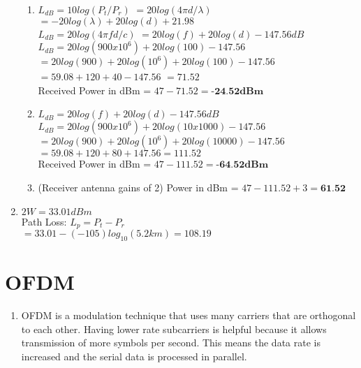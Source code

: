 \documentclass[11pt]{article}
\begin{document}
\begin{enumerate}[label=(\alph*)]
{\begin{enumerate}[label=(\roman*)]
{		$P_{dbM} = 10log(P_{mW}/1mW)$
		$= 10log(50000) \approx 47dBm$
	}
	
	\item{
		$L_{dB} = 10log(P_t/P_r)$
		$= 20log(4\pi d/ \lambda)$
		$= -20log(\lambda) + 20log(d) + 21.98$ \\
		
		$L_{dB} = 20log(4\pi f d/c)$
		$ = 20log(f) + 20log(d) - 147.56dB$ \\
		
		$L_{dB} = 20log(900x10^6) + 20log(100) - 147.56$
		$= 20log(900) + 20log(10^6) + 20log(100) - 147.56$
		$= 59.08 + 120 + 40 - 147.56$
		$= 71.52$ \\
		
		Received Power in dBm = $47-71.52 = \textbf{-24.52dBm}$
	}
	
	\item {
		$L_{dB} = 20log(f) + 20log(d) - 147.56dB$ \\
	
		$L_{dB} = 20log(900x10^6) + 20log(10x1000) - 147.56$ \\
		$= 20log(900) + 20log(10^6) + 20log(10000) - 147.56$ \\ 
		$= 59.08 + 120 + 80 + 147.56 = 111.52$ \\
	
		Received Power in dBm = $47 - 111.52 = \textbf{-64.52dBm}$
	}
	
	\item { 
		(Receiver antenna gains of 2) Power in dBm = $47 - 111.52 + 3 = \textbf{61.52}$
	}
	\end{enumerate}
}
\item {
	$2W = 33.01 dBm$ \\
	Path Loss: $L_p = P_t - P_r$ \\
	$= 33.01 - (-105)log_{10}(5.2km) = 108.19$ \\ 
}
\end{enumerate}
 
 
\section{OFDM}
\begin{enumerate}[label=(\alph*)]
\item {
	OFDM is a modulation technique that uses many carriers that are orthogonal to each other.
	Having lower rate subcarriers is helpful because it allows transmission of more symbols per second. 
	This means the data rate is increased and the serial data is processed in parallel.
}
\end{enumerate}
\end{document}
